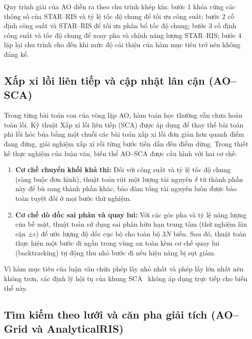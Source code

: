 Quy trình giải của AO diễn ra theo chu trình khép kín: bước 1 khóa cứng các thông số của STAR--RIS và tỷ lệ
tốc độ chung để tối ưu công suất; bước 2 cố định công suất và STAR--RIS để tối ưu phân bổ tốc độ chung;
bước 3 cố định công suất và tốc độ chung để xoay pha và chỉnh năng lượng STAR--RIS; bước 4 lặp lại chu
trình cho đến khi mức độ cải thiện của hàm mục tiêu trở nên không đáng kể.

\subsection{Xấp xỉ lồi liên tiếp và cập nhật lân cận (AO--SCA)}
\label{ssec:sca}


Trong từng bài toán con của vòng lặp AO, hàm toán học thường vẫn chưa hoàn toàn lồi. Kỹ thuật Xấp xỉ lồi
liên tiếp (SCA) được áp dụng để thay thế bài toán phi lồi hóc búa bằng một chuỗi các bài toán xấp xỉ lồi
đơn giản hơn quanh điểm đang đứng, giải nghiệm xấp xỉ rồi từng bước tiến dần đến điểm dừng. Trong thiết kế
thực nghiệm của luận văn, biến thể AO--SCA được cấu hình với hai cơ chế:
\begin{enumerate}
\item \textbf{Cơ chế chuyển khối khả thi:} Đối với công suất và tỷ lệ tốc độ chung (ràng buộc đơn hình),
  thuật toán rút một lượng tài nguyên $\delta$ từ thành phần này để bù sang thành phần khác, bảo đảm tổng
  tài nguyên luôn được bảo toàn tuyệt đối ở mọi bước thử nghiệm.
\item \textbf{Cơ chế dò dốc sai phân và quay lui:} Với các góc pha và tỷ lệ năng lượng của bề mặt, thuật
  toán sử dụng sai phân hữu hạn trung tâm (thử nghiệm lân cận $\pm\epsilon$) để ước lượng độ dốc cục bộ cho
  toàn bộ $3N$ biến. Sau đó, thuật toán thực hiện một bước đi ngắn trong vùng an toàn kèm cơ chế quay lui
  (backtracking) tự động thu nhỏ bước đi nếu hiệu năng bị sụt giảm.
\end{enumerate}
Vì hàm mục tiêu của luận văn chứa phép lấy nhỏ nhất và phép lấy lớn nhất nên không trơn, các định lý hội
tụ của khung SCA~\cite{Scutari2017SCA} không áp dụng trực tiếp cho biến thể này.

\subsection{Tìm kiếm theo lưới và căn pha giải tích (AO--Grid và AnalyticalRIS)}
\label{ssec:grid-analytical}

